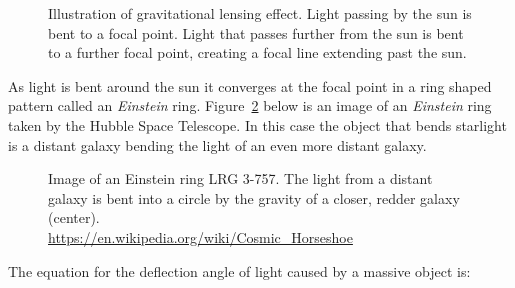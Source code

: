 \documentclass[12pt]{article} %
\begin{document}
\begin{figure}[H]
\caption{Illustration of gravitational lensing effect. Light passing by the sun is bent to a focal point. Light that passes further from the sun is bent to a further focal point, creating a focal line extending past the sun.}
\label{fig:lensing}
\end{figure}

As light is bent around the sun it converges at the focal point in a ring shaped pattern called an \textit{Einstein} ring. Figure~\ref{fig:reallense} below is an image of an \textit{Einstein} ring taken by the Hubble Space Telescope. In this case the object that bends starlight is a distant galaxy bending the light of an even more distant galaxy. 

\begin{figure}[H]
\caption{Image of an Einstein ring LRG 3-757. The light from a distant galaxy is bent into a circle by the gravity of a closer, redder galaxy (center).\\ \url{https://en.wikipedia.org/wiki/Cosmic_Horseshoe}}
\label{fig:reallense}
\end{figure}

The equation for the deflection angle of light caused by a massive object is:
\end{document}
